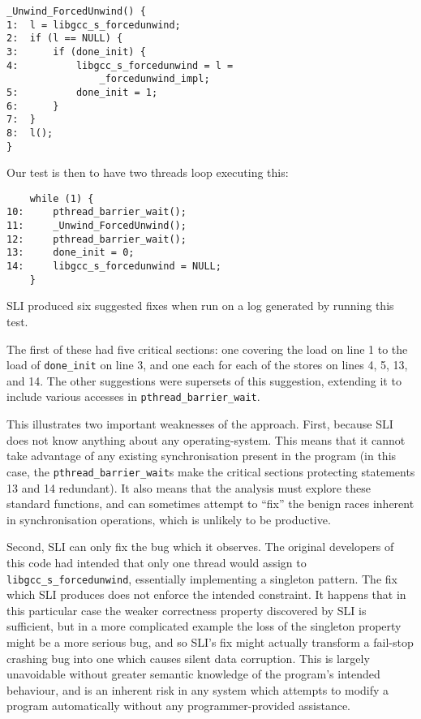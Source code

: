 \documentclass[10pt,twocolumn,preprint,natbib,authoryear]{sigplanconf}
\begin{document}
\begin{verbatim}
_Unwind_ForcedUnwind() {
1:  l = libgcc_s_forcedunwind;
2:  if (l == NULL) {
3:      if (done_init) {
4:          libgcc_s_forcedunwind = l =
                _forcedunwind_impl;
5:          done_init = 1;
6:      }
7:  }
8:  l();
}
\end{verbatim}

Our test is then to have two threads loop executing this:

\begin{verbatim}
    while (1) {
10:     pthread_barrier_wait();
11:     _Unwind_ForcedUnwind();
12:     pthread_barrier_wait();
13:     done_init = 0;
14:     libgcc_s_forcedunwind = NULL;
    }
\end{verbatim}

SLI produced six suggested fixes when run on a log generated by
running this test.

The first of these had five critical sections: one covering the load
on line 1 to the load of \verb|done_init| on line 3, and one each for
each of the stores on lines 4, 5, 13, and 14.  The other suggestions
were supersets of this suggestion, extending it to include various
accesses in \verb|pthread_barrier_wait|.

This illustrates two important weaknesses of the approach.  First,
because SLI does not know anything about any operating-system.  This
means that it cannot take advantage of any existing synchronisation
present in the program (in this case, the \verb|pthread_barrier_wait|s
make the critical sections protecting statements 13 and 14 redundant).
It also means that the analysis must explore these standard functions,
and can sometimes attempt to ``fix'' the benign races inherent in
synchronisation operations, which is unlikely to be productive.

Second, SLI can only fix the bug which it observes.  The original
developers of this code had intended that only one thread would assign
to \verb|libgcc_s_forcedunwind|, essentially implementing a singleton
pattern.  The fix which SLI produces does not enforce the intended
constraint.  It happens that in this particular case the weaker
correctness property discovered by SLI is sufficient, but in a more
complicated example the loss of the singleton property might be a more
serious bug, and so SLI's fix might actually transform a fail-stop
crashing bug into one which causes silent data corruption.  This is
largely unavoidable without greater semantic knowledge of the
program's intended behaviour, and is an inherent risk in any system
which attempts to modify a program automatically without any
programmer-provided assistance.
\end{document}
